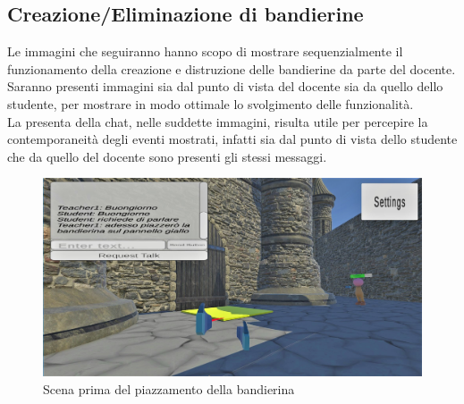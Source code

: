 \subsection{Creazione/Eliminazione di bandierine}
Le immagini che seguiranno hanno scopo di mostrare sequenzialmente il funzionamento della creazione e distruzione delle bandierine da parte del docente.
\\Saranno presenti immagini sia dal punto di vista del docente sia da quello dello studente, per mostrare in modo ottimale lo svolgimento delle funzionalità.
\\La presenta della chat, nelle suddette immagini, risulta utile per percepire la contemporaneità degli eventi mostrati, infatti sia dal punto di vista dello studente che da quello del docente sono presenti gli stessi messaggi.
\begin{figure}[H]
\centering
\includegraphics[scale = 0.25]{Immagini/Dimostrazioni d'uso/piazzobandierina.jpg}
\caption{Scena prima del piazzamento della bandierina}
\end{figure}
